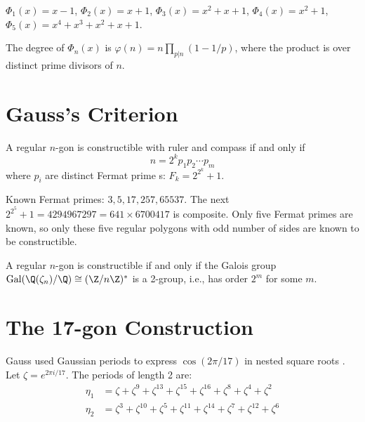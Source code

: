 \begin{example}
$\Phi_1(x) = x - 1$, $\Phi_2(x) = x + 1$, $\Phi_3(x) = x^2 + x + 1$, $\Phi_4(x) = x^2 + 1$, $\Phi_5(x) = x^4 + x^3 + x^2 + x + 1$.
\end{example}

\begin{theorem}
The degree of $\Phi_n(x)$ is $\varphi(n) = n\prod_{p|n}(1-1/p)$, where the product is over distinct prime divisors of $n$.
\end{theorem}

\section{Gauss's Criterion}

\begin{theorem}
A regular $n$-gon is constructible with ruler and compass if and only if
\[
n = 2^k p_1 p_2 \cdots p_m
\]
where $p_i$ are distinct Fermat prime s: $F_k = 2^{2^k} + 1$.
\end{theorem}

Known Fermat primes: $3, 5, 17, 257, 65537$. The next $2^{2^5}+1 = 4294967297 = 641 \times 6700417$ is composite. Only five Fermat primes are known, so only these five regular polygons with odd number of sides are known to be constructible.

\begin{theorem}
A regular $n$-gon is constructible if and only if the Galois group $\operatorname{Gal}(\Q(\zeta_n)/\Q) \cong (\Z/n\Z)^*$ is a 2-group, i.e., has order $2^m$ for some $m$.
\end{theorem}

\section{The 17-gon Construction}

Gauss used Gaussian periods to express $\cos(2\pi/17)$ in nested square roots . Let $\zeta = e^{2\pi i/17}$. The periods of length 2 are:
\begin{align*}
\eta_1 &= \zeta + \zeta^9 + \zeta^{13} + \zeta^{15} + \zeta^{16} + \zeta^8 + \zeta^4 + \zeta^2 \\
\eta_2 &= \zeta^3 + \zeta^{10} + \zeta^5 + \zeta^{11} + \zeta^{14} + \zeta^7 + \zeta^{12} + \zeta^6
\end{align*}

